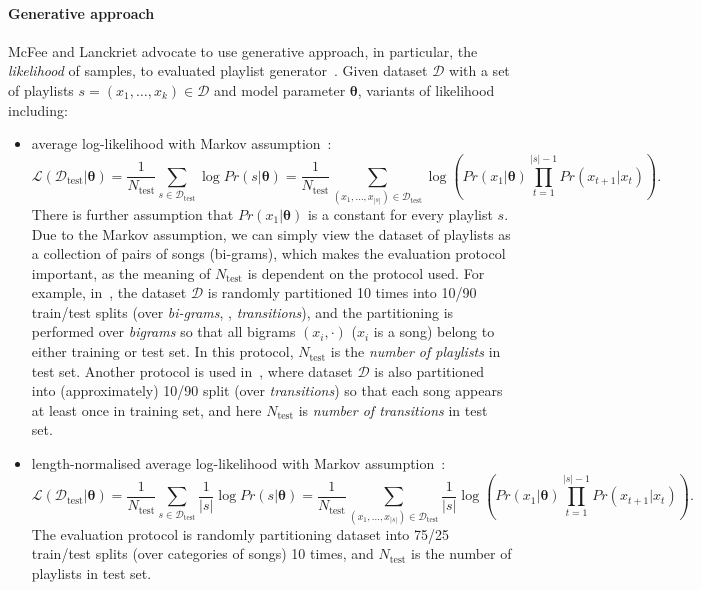 \paragraph{Generative approach}
McFee and Lanckriet advocate to use generative approach, in particular, the \emph{likelihood} of samples, 
to evaluated playlist generator~\cite{mcfee2011natural}.
Given dataset $\mathcal{D}$ with a set of playlists $s=(x_1, \dots, x_k) \in \mathcal{D}$ and model parameter $\mathbf{\theta}$, 
variants of likelihood including:
\begin{itemize}
\item average log-likelihood with Markov assumption~\cite{mcfee2011natural,chen2012playlist}:
      \begin{equation*}
      \mathcal{L}(\mathcal{D}_\text{test} | \bm{\theta}) 
      = \frac{1}{N_\text{test}} \sum_{s \in \mathcal{D}_\text{test}} \log Pr(s | \bm{\theta})
      = \frac{1}{N_\text{test}} \sum_{(x_1,\dots,x_{|s|}) \in \mathcal{D}_\text{test}} 
        \log \left( Pr(x_1 |\bm{\theta}) \prod_{t=1}^{|s|-1} Pr(x_{t+1} | x_t) \right).
      \end{equation*}
      There is further assumption that $Pr(x_1 |\mathbf{\theta})$ is a constant for every playlist $s$.
      Due to the Markov assumption, we can simply view the dataset of playlists as a collection of pairs of songs (bi-grams),
      which makes the evaluation protocol important, as the meaning of $N_\text{test}$ is dependent on the protocol used.
      For example, in~\cite{mcfee2011natural}, 
      the dataset $\mathcal{D}$ is randomly partitioned 10 times into 10/90 train/test splits (over \emph{bi-grams}, \ie, \emph{transitions}),
      and the partitioning is performed over \emph{bigrams} so that all bigrams $(x_i, \cdot)$ ($x_i$ is a song) belong to either training or test set.
      In this protocol, $N_\text{test}$ is the \emph{number of playlists} in test set.
      Another protocol is used in~\cite{chen2012playlist}, 
      where dataset $\mathcal{D}$ is also partitioned into (approximately) 10/90 split (over \emph{transitions}) 
      so that each song appears at least once in training set,
      and here $N_\text{test}$ is \emph{number of transitions} in test set.      
\item length-normalised average log-likelihood with Markov assumption~\cite{mcfee2012hypergraph}:
      \begin{equation*}
      \mathcal{L}(\mathcal{D}_\text{test} | \bm{\theta}) 
      = \frac{1}{N_\text{test}} \sum_{s \in \mathcal{D}_\text{test}} \frac{1}{|s|} \log Pr(s | \bm{\theta})
      = \frac{1}{N_\text{test}} \sum_{(x_1,\dots,x_{|s|}) \in \mathcal{D}_\text{test}} 
        \frac{1}{|s|} \log \left( Pr(x_1 |\bm{\theta}) \prod_{t=1}^{|s|-1} Pr(x_{t+1} | x_t) \right).
      \end{equation*}
      The evaluation protocol is randomly partitioning dataset into 75/25 train/test splits (over categories of songs) 10 times,
      and $N_\text{test}$ is the number of playlists in test set.
\end{itemize}

